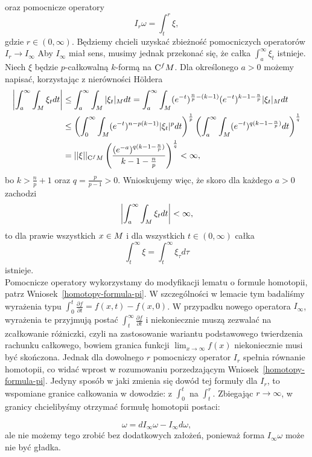 \documentclass[licencjacka]{pracamgr}
\theoremstyle{definition}
\theoremstyle{definition}
\theoremstyle{plain}
\theoremstyle{plain}
\theoremstyle{plain}
\theoremstyle{plain}
\theoremstyle{plain}
\def\cfm{\ensuremath\mathrm{C}^fM}
\def\M{\ensuremath M}
\begin{document}
oraz pomocnicze operatory
\[
I_r \omega = \int_t^r \xi,
\] gdzie $r \in (0, \infty)$.
Będziemy chcieli uzyskać zbieżność pomocniczych operatorów $I_r \to I_\infty$
Aby $I_\infty$ miał sens,  musimy jednak przekonać się, że całka $\int_a^\infty
\xi_t$ istnieje.  Niech $\xi$ będzie $p$-całkowalną $k$-formą na $\cfm$. Dla
określonego $a > 0$ możemy napisać, korzystając z nierówności Höldera
\begin{align*}
\left|
    \int_a^\infty \int_\M \xi_{t} dt
\right|
 & \leq
    \int_a^\infty \int_\M |\xi_{t}|_M dt =
    \int_a^\infty \int_\M (e^{-t})^{\frac{n}{p}-(k-1)} (e^{-t})^{k-1-\frac{n}{p}} |\xi_{t}|_M dt  \\
 & \leq 
\left(
    \int_0^\infty \int_\M (e^{-t})^{n-p(k-1)} |\xi_{t}|^p dt
\right)^\frac{1}{p}
\left(
    \int_a^\infty \int_\M (e^{-t})^{ q ( k-1-\frac{n}{p}) } dt 
\right)^\frac{1}{q} \\
& = 
    ||\xi||_{\cfm}
\left(
   \frac{ (e^{-a})^{ q ( k-1-\frac{n}{p}) }   }{ k-1-\frac{n}{p} } 
\right)^\frac{1}{q} < \infty,
\end{align*}
bo $k > \frac{n}{p} +1$ oraz $q = \frac{p}{p-1} > 0$.
Wnioskujemy więc, że skoro dla każdego $a > 0$  zachodzi
\[
\left|
    \int_a^\infty \int_\M \xi_{t} dt
\right| < \infty,
\]
to dla prawie wszystkich $x \in \M$ i dla wszystkich $t \in (0, \infty)$ całka
\[
\int_t^\infty \xi  = \int_t^\infty \xi_{\tau} d\tau
\]
istnieje. \\

Pomocnicze operatory wykorzystamy do modyfikacji lematu o formule homotopii, 
patrz Wniosek~\ref{homotopy-formula-pi}.  W szczególności w lemacie tym
badaliśmy wyrażenia typu $\int_0^t \frac{\partial f }{\partial t} = f(x, t) -
f(x, 0)$.  W przypadku nowego operatora $I_\infty$, wyrażenia te przyjmują
postać $\int_t^\infty \frac{\partial f }{\partial t}$ i niekoniecznie muszą
zezwalać na zcałkowanie różniczki, czyli na zastosowanie wariantu podstawowego
twierdzenia rachunku całkowego, bowiem granica funkcji $\lim_{x \to
\infty} f(x)$ niekoniecznie musi być skończona. Jednak dla dowolnego $r$
pomocniczy operator $I_r$ spełnia równanie homotopii, co widać wprost w
rozumowaniu porzedzającym Wniosek~\ref{homotopy-formula-pi}.  Jedyny sposób w
jaki zmienia się dowód tej formuły dla $I_r$, to wspomiane granice całkowania w
dowodzie: z $\int_0^t$ na $\int_t^r$.  Zbiegając $r \to \infty$,  w granicy
chcielibyśmy otrzymać formułę homotopii postaci:

\begin{equation}\label{homotopy-inf}
\omega = dI_\infty \omega - I_\infty d \omega,
\end{equation}
ale nie możemy tego zrobić bez dodatkowych założeń, ponieważ forma $I_\infty
\omega$ może nie być gładka.  
\end{document}
